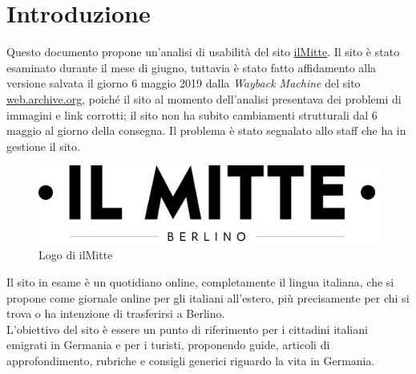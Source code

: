 \newpage
\section{Introduzione}
Questo documento propone un'analisi di usabilità del sito \href{https://ilmitte.com}{ilMitte}. Il sito è stato esaminato durante il mese di giugno, tuttavia è stato fatto affidamento alla versione salvata il giorno 6 maggio 2019 dalla \textit{Wayback Machine} del sito \href{https://web.archive.org/web/}{web.archive.org}, poiché il sito al momento dell'analisi presentava dei problemi di immagini e link corrotti; il sito non ha subito cambiamenti strutturali dal 6 maggio al giorno della consegna. Il problema è stato segnalato allo staff che ha in gestione il sito.

\vspace{40pt}
\begin{figure}[htbp]
\begin{center}
\includegraphics[width=30em]{img/logo}
\caption{Logo di ilMitte}
\end{center}
\end{figure}
\vspace{30pt}

Il sito in esame è un quotidiano online, completamente il lingua italiana, che si propone come giornale online per gli italiani all'estero, più precisamente per chi si trova o ha intenzione di trasferirsi a Berlino.\\
L'obiettivo del sito è essere un punto di riferimento per i cittadini italiani emigrati in Germania e per i turisti, proponendo guide, articoli di approfondimento, rubriche e consigli generici riguardo la vita in Germania.